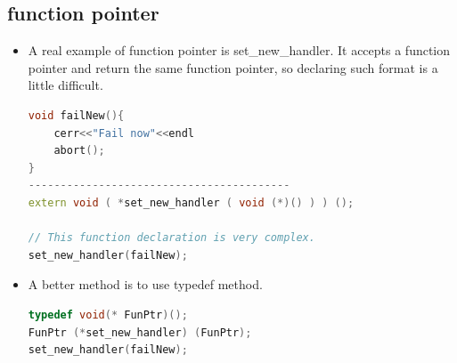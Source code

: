 \documentclass[a4paper,12pt,twoside]{book}
\begin{document}
\subsection{function pointer}
\begin{itemize}  

\item A real example of function pointer is set\_new\_handler. It accepts a function pointer and return the same function pointer, so declaring such format is a little difficult.
\begin{lstlisting}[frame=single, language=c++]
void failNew(){
	cerr<<"Fail now"<<endl
	abort();
}
-----------------------------------------
extern void ( *set_new_handler ( void (*)() ) ) ();

// This function declaration is very complex.
set_new_handler(failNew);
\end{lstlisting}

\item A better method is to use typedef method.

\begin{lstlisting}[frame=single, language=c++]
typedef void(* FunPtr)();
FunPtr (*set_new_handler) (FunPtr);
set_new_handler(failNew);
\end{lstlisting}

\end{itemize}
\end{document}
